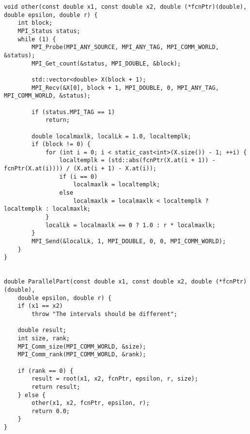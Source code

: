 \documentclass{report}
\begin{document}
\begin{lstlisting}
void other(const double x1, const double x2, double (*fcnPtr)(double), double epsilon, double r) {
    int block;
    MPI_Status status;
    while (1) {
        MPI_Probe(MPI_ANY_SOURCE, MPI_ANY_TAG, MPI_COMM_WORLD, &status);
        MPI_Get_count(&status, MPI_DOUBLE, &block);

        std::vector<double> X(block + 1);
        MPI_Recv(&X[0], block + 1, MPI_DOUBLE, 0, MPI_ANY_TAG, MPI_COMM_WORLD, &status);

        if (status.MPI_TAG == 1)
            return;

        double localmaxlk, localLk = 1.0, localtemplk;
        if (block != 0) {
            for (int i = 0; i < static_cast<int>(X.size()) - 1; ++i) {
                localtemplk = (std::abs(fcnPtr(X.at(i + 1)) - fcnPtr(X.at(i)))) / (X.at(i + 1) - X.at(i));
                if (i == 0)
                    localmaxlk = localtemplk;
                else
                    localmaxlk = localmaxlk < localtemplk ? localtemplk : localmaxlk;
            }
            localLk = localmaxlk == 0 ? 1.0 : r * localmaxlk;
        }
        MPI_Send(&localLk, 1, MPI_DOUBLE, 0, 0, MPI_COMM_WORLD);
    }
}


double ParallelPart(const double x1, const double x2, double (*fcnPtr)(double),
    double epsilon, double r) {
    if (x1 == x2)
        throw "The intervals should be different";

    double result;
    int size, rank;
    MPI_Comm_size(MPI_COMM_WORLD, &size);
    MPI_Comm_rank(MPI_COMM_WORLD, &rank);

    if (rank == 0) {
        result = root(x1, x2, fcnPtr, epsilon, r, size);
        return result;
    } else {
        other(x1, x2, fcnPtr, epsilon, r);
        return 0.0;
    }
}
\end{lstlisting}
\newpage
\end{document}
